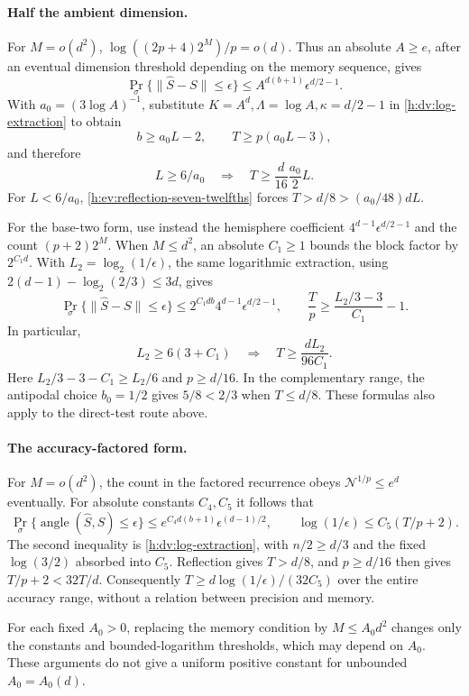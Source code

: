 \paragraph{Half the ambient dimension.}
For \(M=o(d^2)\), \(\log((2p+4)2^M)/p=o(d)\).
Thus an absolute \(A\ge e\), after an eventual dimension threshold
depending on the memory sequence, gives
\begin{equation}\label{h:ev:half-ambient-absolute}
 \Pr_\sigma\{\|\widehat S-S\|\le\epsilon\}
 \le A^{d(b+1)}\epsilon^{d/2-1}.
\end{equation}
With \(a_0=(3\log A)^{-1}\), substitute
\(K=A^d,\Lambda=\log A,\kappa=d/2-1\) in
\eqref{h:dv:log-extraction} to obtain
\begin{equation}\label{h:ev:half-ambient-log}
 b\ge a_0L-2,\qquad T\ge p(a_0L-3),
\end{equation}
and therefore
\begin{equation}\label{h:ev:half-ambient-threshold}
 L\ge6/a_0\quad\Longrightarrow\quad
 T\ge\frac d{16}\frac{a_0}{2}L.
\end{equation}
For \(L<6/a_0\), \eqref{h:ev:reflection-seven-twelfths} forces
\(T>d/8>(a_0/48)dL\).

For the base-two form, use instead the hemisphere coefficient
\(4^{d-1}\epsilon^{d/2-1}\) and the count \((p+2)2^M\).
When \(M\le d^2\), an absolute \(C_1\ge1\) bounds the block factor
by \(2^{C_1d}\). With \(L_2=\log_2(1/\epsilon)\), the same
logarithmic extraction, using
\(2(d-1)-\log_2(2/3)\le3d\), gives
\begin{equation}\label{h:ev:binary-endgame}
 \Pr_\sigma\{\|\widehat S-S\|\le\epsilon\}
 \le2^{C_1db}4^{d-1}\epsilon^{d/2-1},
 \qquad
 \frac Tp\ge\frac{L_2/3-3}{C_1}-1.
\end{equation}
In particular,
\begin{equation}\label{h:ev:binary-threshold}
 L_2\ge6(3+C_1)\quad\Longrightarrow\quad
 T\ge\frac{dL_2}{96C_1}.
\end{equation}
Here \(L_2/3-3-C_1\ge L_2/6\) and \(p\ge d/16\).
In the complementary range, the antipodal choice \(b_0=1/2\)
gives \(5/8<2/3\) when \(T\le d/8\).
These formulas also apply to the direct-test route above.

\paragraph{The accuracy-factored form.}
For \(M=o(d^2)\), the count in the factored recurrence obeys
\(\mathcal N^{1/p}\le e^d\) eventually. For absolute constants
\(C_4,C_5\) it follows that
\begin{equation}\label{h:dv:factored-endpoint}
 \Pr_\sigma\{\operatorname{angle}(\widehat S,S)\le\epsilon\}
 \le e^{C_4d(b+1)}\epsilon^{(d-1)/2},
 \qquad
 \log(1/\epsilon)\le C_5(T/p+2).
\end{equation}
The second inequality is \eqref{h:dv:log-extraction}, with
\(n/2\ge d/3\) and the fixed \(\log(3/2)\) absorbed into \(C_5\).
Reflection gives \(T>d/8\), and \(p\ge d/16\) then gives
\(T/p+2<32T/d\). Consequently
\(T\ge d\log(1/\epsilon)/(32C_5)\) over the entire accuracy range,
without a relation between precision and memory.

For each fixed \(A_0>0\), replacing the memory condition by
\(M\le A_0d^2\) changes only the constants and bounded-logarithm
thresholds, which may depend on \(A_0\). These arguments do not give
a uniform positive constant for unbounded \(A_0=A_0(d)\).
